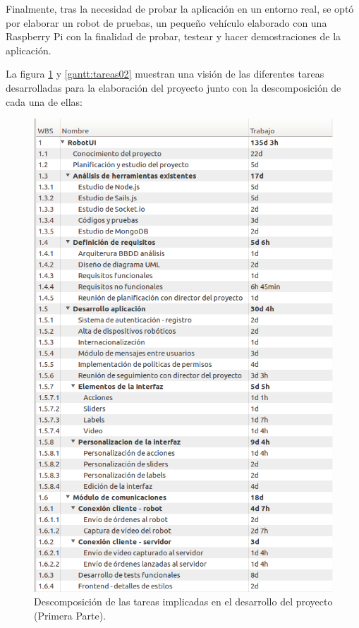 Finalmente, tras la necesidad de probar la aplicación en un entorno real, se optó por elaborar un robot de pruebas, un pequeño vehículo elaborado con una Raspberry Pi con la finalidad de probar, testear y hacer 
demostraciones de la aplicación.

La figura \ref{gantt:tareas01} y \ref{gantt:tareas02} muestran una visión de las diferentes tareas desarrolladas para la elaboración del proyecto junto con la descomposición de cada una de ellas:\\

\begin{figure}
  \begin{center}
    \includegraphics[scale=0.6]{imagenes/planificacion/descomposicion_tareas01.png}
  \end{center}
  \caption{Descomposición de las tareas implicadas en el desarrollo del proyecto (Primera Parte).}
  \label{gantt:tareas01}
\end{figure}


